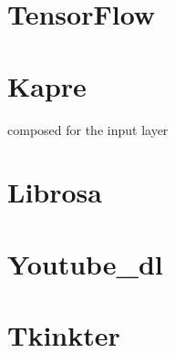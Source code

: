 \section{TensorFlow}

\section{Kapre}
composed for the input layer

\section{Librosa}

\section{Youtube_dl}

\section{Tkinkter}
